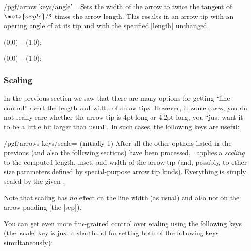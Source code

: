 \begin{key}{/pgf/arrow keys/angle'=}
    Sets the width of the arrow to twice the tangent of $\meta{angle}/2$ times
    the arrow length. This results in an arrow tip with an opening angle of
     at its tip and with the specified |length| unchanged.
\begin{codeexample}[]
\tikz \draw [arrows = {-Stealth[inset=0pt, length=10pt, angle'=90]}]
            (0,0) -- (1,0);
\end{codeexample}
\begin{codeexample}[]
\tikz \draw [arrows = {-Stealth[inset=0pt, length=10pt, angle'=30]}]
            (0,0) -- (1,0);
\end{codeexample}
\end{key}


\subsubsection{Scaling}

In the previous section we saw that there are many options for getting ``fine
control'' overt the length and width of arrow tips. However, in some cases, you
do not really care whether the arrow tip is 4pt long or 4.2pt long, you ``just
want it to be a little bit larger than usual''. In such cases, the following
keys are useful:

\begin{key}{/pgf/arrows keys/scale= (initially 1)}
    After all the other options listed in the previous (and also the following
    sections) have been processed, \tikzname\ applies a \emph{scaling} to the
    computed length, inset, and width of the arrow tip (and, possibly, to other
    size parameters defined by special-purpose arrow tip kinds). Everything is
    simply scaled by the given .
\begin{codeexample}[]
\end{codeexample}
    Note that scaling has \emph{no} effect on the line width (as usual) and
    also not on the arrow padding (the |sep|).
\end{key}

You can get even more fine-grained control over scaling using the following
keys (the |scale| key is just a shorthand for setting both of the following
keys simultaneously):

